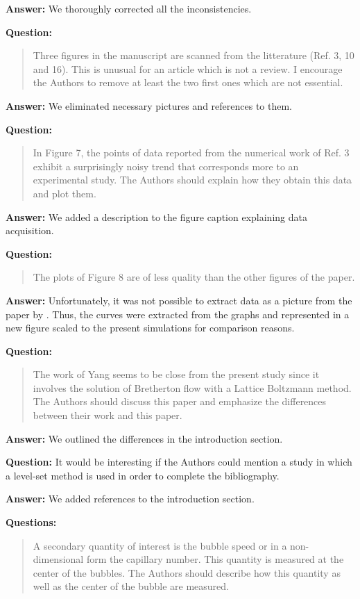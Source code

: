 \documentclass{article}
\begin{document}
\textbf{Answer:} We thoroughly corrected all the inconsistencies.

\textbf{Question:}
\begin{quotation}
Three ﬁgures in the manuscript are scanned from the litterature (Ref. 3, 10 and 16). This is
unusual
for an article which is not a review. I encourage the Authors to remove at least the two ﬁrst ones
which are not essential.
\end{quotation}

\textbf{Answer:} We eliminated necessary pictures and references to them.

\textbf{Question:} 
\begin{quotation}
In Figure 7, the points of data reported from the numerical work of Ref. 3 exhibit a surprisingly
noisy trend that corresponds more to an experimental study. The Authors should explain how they
obtain this data and plot them.
\end{quotation}

\textbf{Answer:} We added a description to the figure caption explaining data acquisition.

\textbf{Question:} 
\begin{quotation}
The plots of Figure 8 are of less quality than the other ﬁgures of the paper.
\end{quotation}

\textbf{Answer:} Unfortunately, it was not possible to extract data as a picture from the paper by
\citet{sehgal-microchannel}. Thus, the curves were extracted from the graphs and represented in a
new figure scaled to the present simulations for comparison reasons.

\textbf{Question:}
\begin{quotation}
The work of Yang seems to be close from the present study since it involves the
solution of Bretherton
ﬂow with a Lattice Boltzmann method. The Authors should discuss this paper and emphasize the
differences between their work and this paper.
\end{quotation}

\textbf{Answer:} We outlined the differences in the introduction section.

\textbf{Question:} It would be interesting if the Authors could mention a study in which a level-set
method is used in
order to complete the bibliography.

\textbf{Answer:} We added references to the introduction section.

\textbf{Questions:} 
\begin{quotation}
A secondary quantity of interest is the bubble speed or in a non-dimensional
form the capillary
number. This quantity is measured at the center of the bubbles. The Authors should describe how
this quantity as well as the center of the bubble are measured.
\end{quotation}
\end{document}
